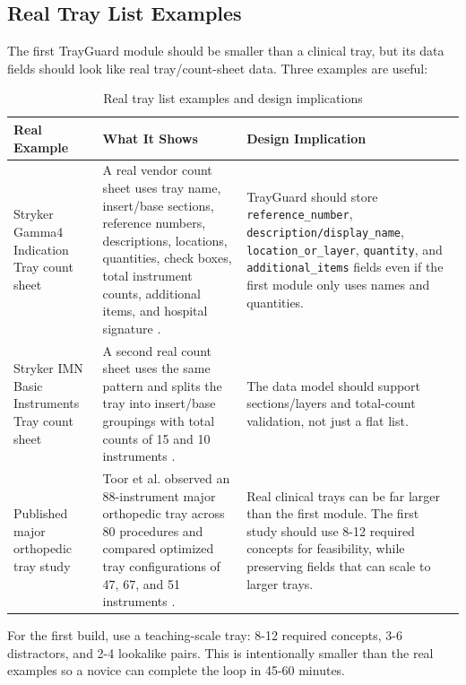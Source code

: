 \documentclass[10pt,a4paper]{article}
\begin{document}
\subsection{Real Tray List Examples}
\label{sec:real-tray-list-examples}

The first TrayGuard module should be smaller than a clinical tray, but its data
fields should look like real tray/count-sheet data. Three examples are useful:
\begin{table}[H]
\centering
\caption{Real tray list examples and design implications}
\label{tab:real-tray-list-examples-and-design-implications}
\small\renewcommand{\arraystretch}{1.2}\setlength{\tabcolsep}{4pt}
\begin{tabularx}{\textwidth}{|>{\raggedright\arraybackslash}X|>{\raggedright\arraybackslash}X|>{\raggedright\arraybackslash}X|}
\hline
Real Example & What It Shows & Design Implication \\
\hline
Stryker Gamma4 Indication Tray count sheet & A real vendor count sheet uses tray name, insert/base sections, reference numbers, descriptions, locations, quantities, check boxes, total instrument counts, additional items, and hospital signature \cite{stryker-gamma4-count-sheet-2023}. & TrayGuard should store \texttt{reference\_number}, \texttt{description/display\_name}, \texttt{location\_or\_layer}, \texttt{quantity}, and \texttt{additional\_items} fields even if the first module only uses names and quantities. \\
\hline
Stryker IMN Basic Instruments Tray count sheet & A second real count sheet uses the same pattern and splits the tray into insert/base groupings with total counts of 15 and 10 instruments \cite{stryker-imn-count-sheet-2023}. & The data model should support sections/layers and total-count validation, not just a flat list. \\
\hline
Published major orthopedic tray study & Toor et al. observed an 88-instrument major orthopedic tray across 80 procedures and compared optimized tray configurations of 47, 67, and 51 instruments \cite{toor-et-al-2022}. & Real clinical trays can be far larger than the first module. The first study should use 8-12 required concepts for feasibility, while preserving fields that can scale to larger trays. \\
\hline
\end{tabularx}
\end{table}
For the first build, use a teaching-scale tray: 8-12 required concepts, 3-6
distractors, and 2-4 lookalike pairs. This is intentionally smaller than the
real examples so a novice can complete the loop in 45-60 minutes.
\end{document}

